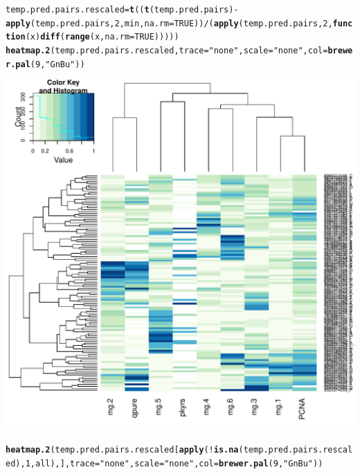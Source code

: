 \documentclass{article}\usepackage[]{graphicx}\usepackage[]{color}
\makeatletter
\def\maxwidth{ %
  \ifdim\Gin@nat@width>\linewidth
    \linewidth
  \else
    \Gin@nat@width
  \fi
}
\newcommand{\hlnum}[1]{\textcolor[rgb]{0.686,0.059,0.569}{#1}}%
\newcommand{\hlstr}[1]{\textcolor[rgb]{0.192,0.494,0.8}{#1}}%
\newcommand{\hlopt}[1]{\textcolor[rgb]{0,0,0}{#1}}%
\newcommand{\hlstd}[1]{\textcolor[rgb]{0.345,0.345,0.345}{#1}}%
\newcommand{\hlkwa}[1]{\textcolor[rgb]{0.161,0.373,0.58}{\textbf{#1}}}%
\newcommand{\hlkwb}[1]{\textcolor[rgb]{0.69,0.353,0.396}{#1}}%
\newcommand{\hlkwc}[1]{\textcolor[rgb]{0.333,0.667,0.333}{#1}}%
\newcommand{\hlkwd}[1]{\textcolor[rgb]{0.737,0.353,0.396}{\textbf{#1}}}%
\newenvironment{kframe}{%
 \def\at@end@of@kframe{}%
 \ifinner\ifhmode%
  \def\at@end@of@kframe{\end{minipage}}%
  \begin{minipage}{\columnwidth}%
 \fi\fi%
 \def\FrameCommand##1{\hskip\@totalleftmargin \hskip-\fboxsep
 \colorbox{shadecolor}{##1}\hskip-\fboxsep
     \hskip-\linewidth \hskip-\@totalleftmargin \hskip\columnwidth}%
 \MakeFramed {\advance\hsize-\width
   \@totalleftmargin\z@ \linewidth\hsize
   \@setminipage}}%
 {\par\unskip\endMakeFramed%
 \at@end@of@kframe}
\newenvironment{knitrout}{}{} %
\makeatother
\begin{document}
\begin{knitrout}
{}


\begin{kframe}\begin{alltt}
\hlstd{temp.pred.pairs.rescaled} \hlkwb{=} \hlkwd{t}\hlstd{((}\hlkwd{t}\hlstd{(temp.pred.pairs)} \hlopt{-} \hlkwd{apply}\hlstd{(temp.pred.pairs,} \hlnum{2}\hlstd{, min,} \hlkwc{na.rm} \hlstd{=} \hlnum{TRUE}\hlstd{))} \hlopt{/} \hlstd{(}\hlkwd{apply}\hlstd{(temp.pred.pairs,} \hlnum{2}\hlstd{,} \hlkwa{function}\hlstd{(}\hlkwc{x}\hlstd{)} \hlkwd{diff}\hlstd{(}\hlkwd{range}\hlstd{(x,} \hlkwc{na.rm} \hlstd{=} \hlnum{TRUE}\hlstd{)))))}
\hlkwd{heatmap.2}\hlstd{(temp.pred.pairs.rescaled,} \hlkwc{trace} \hlstd{=} \hlstr{"none"}\hlstd{,} \hlkwc{scale} \hlstd{=} \hlstr{"none"}\hlstd{,} \hlkwc{col} \hlstd{=} \hlkwd{brewer.pal}\hlstd{(}\hlnum{9}\hlstd{,} \hlstr{"GnBu"}\hlstd{))}
\end{alltt}
\end{kframe}

{\centering \includegraphics[width=\maxwidth]{figure/metagene-pairs-2} 

}


\begin{kframe}\begin{alltt}
\hlkwd{heatmap.2}\hlstd{(temp.pred.pairs.rescaled[}\hlkwd{apply}\hlstd{(}\hlopt{!}\hlkwd{is.na}\hlstd{(temp.pred.pairs.rescaled),} \hlnum{1}\hlstd{, all),],} \hlkwc{trace} \hlstd{=} \hlstr{"none"}\hlstd{,} \hlkwc{scale} \hlstd{=} \hlstr{"none"}\hlstd{,} \hlkwc{col} \hlstd{=} \hlkwd{brewer.pal}\hlstd{(}\hlnum{9}\hlstd{,} \hlstr{"GnBu"}\hlstd{))}
\end{alltt}
\end{kframe}


\end{knitrout}
\end{document}
